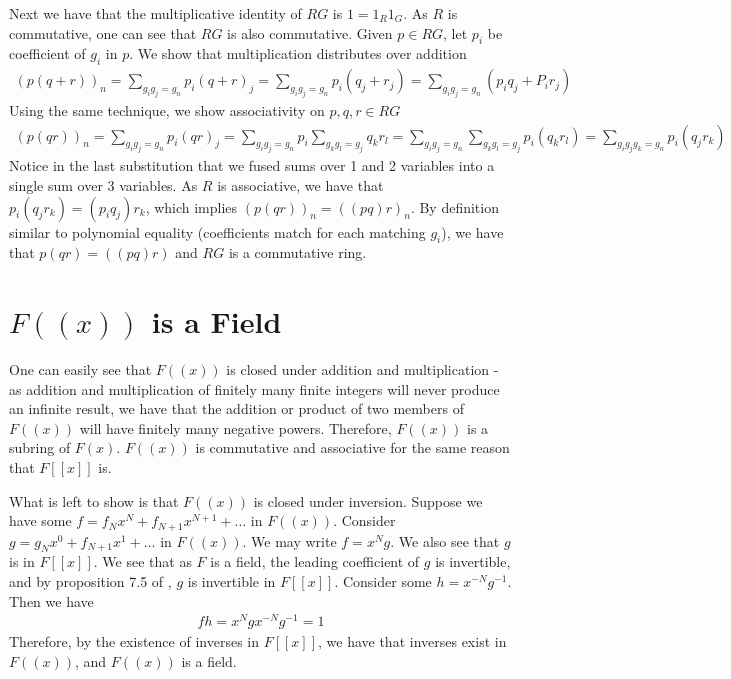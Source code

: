 \documentclass[12pt]{article}
\newcommand*{\inv}{^{-1}}
\begin{document}
Next we have that the multiplicative identity of $RG$ is $1 = 1_R1_G$. As $R$ is commutative, one can see that $RG$ is also commutative. Given $ p \in RG$, let $p_i$ be coefficient of $g_i$ in $p$. We show that multiplication distributes over addition
\begin{align*}
(p(q + r))_n = \sum_{g_i g_j = g_n} p_i (q + r)_j = \sum_{g_i g_j = g_n} p_i (q_j + r_j) =  \sum_{g_i g_j = g_n} \left(p_i q_j + P_i r_j\right)
\end{align*}
Using the same technique, we show associativity on $p, q, r \in RG$
\begin{align*}
(p(qr))_n = \sum_{g_i g_j = g_n} p_i (qr)_j = \sum_{g_i g_j = g_n} p_i \sum_{g_k g_l = g_j} q_k r_l = \sum_{g_i g_j = g_n} \sum_{g_k g_l = g_j} p_i (q_k r_l) = \sum_{g_i g_j g_k = g_n}  p_i (q_j r_k)
\end{align*}
Notice in the last substitution that we fused sums over 1 and 2 variables into a single sum over 3 variables. As $R$ is associative, we have that $p_i(q_j r_k) = (p_i q_j)r_k$, which implies $(p(qr))_n = ((pq)r)_n$. By definition similar to polynomial equality (coefficients match for each matching $g_i$), we have that $p(qr) = ((pq)r)$ and $RG$ is a commutative ring.


\section{$F((x))$ is a Field}
One can easily see that $F((x))$ is closed under addition and multiplication - as addition and multiplication of finitely many finite integers will never produce an infinite result, we have that the addition or product of two members of $F((x))$ will have finitely many negative powers. Therefore, $F((x))$ is a subring of $F(x)$. $F((x))$ is commutative and associative for the same reason that $F[[x]]$ is.

What is left to show is that $F((x))$ is closed under inversion. Suppose we have some $f = f_Nx^N + f_{N+1}x^{N+1} + \ldots$ in $F((x))$. Consider $g = g_Nx^0 + f_{N+1}x^1 + \ldots$ in $F((x))$. We may write $f = x^Ng$. We also see that $g$ is in $F[[x]]$. We see that as $F$ is a field, the leading coefficient of $g$ is invertible, and by proposition 7.5 of \cite{wagner}, $g$ is invertible in $F[[x]]$. Consider some $h = x^{-N}g\inv$. Then we have 
\begin{align*}
fh = x^N g x^{-N} g\inv = 1
\end{align*}
Therefore, by the existence of inverses in $F[[x]]$, we have that inverses exist in $F((x))$, and $F((x))$ is a field.
\end{document}
